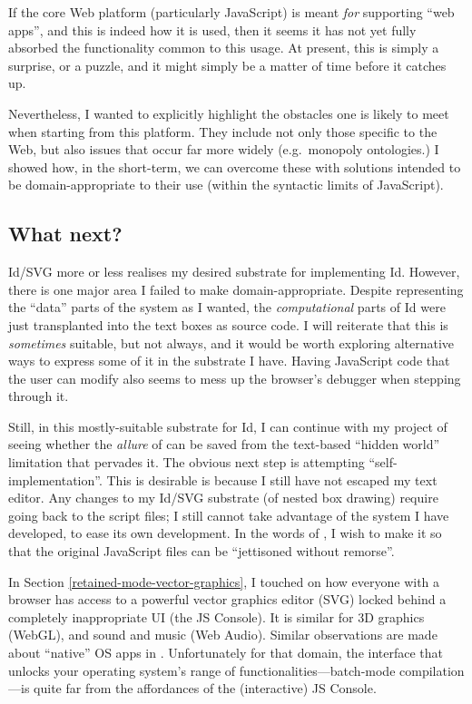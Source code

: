 If the core Web platform (particularly JavaScript) is meant \emph{for}
supporting ``web apps'', and this is indeed how it is used, then it
seems it has not yet fully absorbed the functionality common to this
usage. At present, this is simply a surprise, or a puzzle, and it might
simply be a matter of time before it catches up.

Nevertheless, I wanted to explicitly highlight the obstacles one is
likely to meet when starting from this platform. They include not only
those specific to the Web, but also issues that occur far more widely
(e.g.~monopoly ontologies.) I showed how, in the short-term, we can
overcome these with solutions intended to be domain-appropriate to their
use (within the syntactic limits of JavaScript).

\hypertarget{what-next}{%
\subsection{What next?}\label{what-next}}

Id{}/SVG more or less realises my desired substrate for implementing
Id{}. However, there is one major area I failed to make
domain-appropriate. Despite representing the ``data'' parts of the
system as I wanted, the \emph{computational} parts of Id{} were just
transplanted into the text boxes as source code. I will reiterate that
this is \emph{sometimes} suitable, but not always, and it would be worth
exploring alternative ways to express some of it in the substrate I
have. Having JavaScript code that the user can modify also seems to mess
up the browser's debugger when stepping through it.

Still, in this mostly-suitable substrate for Id{}, I can continue with
my project of seeing whether the \emph{allure} of \cite{COLAs} can be
saved from the text-based ``hidden world'' limitation that pervades it.
The obvious next step is attempting ``self-implementation''. This is
desirable is because I still have not escaped my text editor. Any
changes to my Id{}/SVG substrate (of nested box drawing) require going
back to the script files; I still cannot take advantage of the system I
have developed, to ease its own development. In the words of
\cite{COLAs}, I wish to make it so that the original JavaScript files
can be ``jettisoned without remorse''.

In Section \ref{retained-mode-vector-graphics}, I touched on how
everyone with a browser has access to a powerful vector graphics editor
(SVG) locked behind a completely inappropriate UI (the JS Console). It
is similar for 3D graphics (WebGL), and sound and music (Web Audio).
Similar observations are made about ``native'' OS apps in
\cite{prog21-dyn}. Unfortunately for that domain, the interface that
unlocks your operating system's range of functionalities---batch-mode
compilation---is quite far from the affordances of the (interactive) JS
Console.

